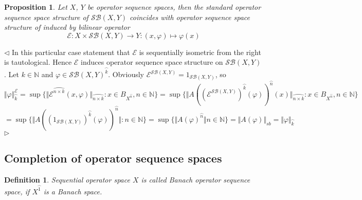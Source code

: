 \documentclass[12pt]{article}
\newtheorem{proposition}[theorem]{Proposition}
\newtheorem{definition}[theorem]{Definition}
\newenvironment{proof}{\par $\triangleleft$}{$\triangleright$}
\begin{document}
\begin{proposition}\label{PrSQOpSqQuanIsEquivToStandard}
Let $X$, $Y$ be operator sequence spaces, then the standard operator sequence 
space structure of $\mathcal{SB}(X,Y)$ coincides with operator sequence space 
structure of induced by bilinear operator
$$
\mathcal{E}:X\times\mathcal{SB}(X,Y)\to Y:(x,\varphi)\mapsto\varphi(x)
$$
\end{proposition}
\begin{proof}
In this particular case statement that $\mathcal{E}$ is sequentially isometric 
from the right is tautological. Hence $\mathcal{E}$ induces operator sequence 
space structure on $\mathcal{SB}(X,Y)$. Let $k\in\mathbb{N}$ and 
$\varphi\in{\mathcal{SB}(X,Y)}^{\wideparen{k}}$. 
Obviously $\mathcal{\mathcal{E}}^{\mathcal{SB}(X,Y)}=1_{\mathcal{SB}(X,Y)}$, so
$$
\Vert
    \varphi
\Vert_{\wideparen{k}}^{\mathcal{E}}
=\sup \{
    \Vert
        \mathcal{E}^{\wideparen{n\times k}}(x,\varphi)
    \Vert_{\wideparen{n\times k}}
    :x\in B_{X^{\wideparen{n}}},n\in\mathbb{N} \}
=\sup \{
    \Vert
        {A(
            {(
                \mathcal{E}^{\mathcal{SB}(X,Y)}
            )}^{\wideparen{k}}(\varphi)
        )}^{\wideparen{n}}(x)
    \Vert_{\wideparen{n\times k}}
    :x\in B_{X^{\wideparen{n}}}, n\in\mathbb{N}
 \}
$$
$$
=\sup \{
    \Vert
        {A({(1_{\mathcal{SB}(X,Y)})}^{\wideparen{k}}(\varphi))}^{\wideparen{n}}
    \Vert
    :n\in\mathbb{N} \}
=\sup \{
    \Vert 
        {A(\varphi)}^{\wideparen{n}}
    \Vert
        n\in\mathbb{N}
 \}
=\Vert A(\varphi)\Vert_{sb}=\Vert\varphi\Vert_{\wideparen{k}}
$$
\end{proof}

























\subsection{Completion of operator sequence spaces}

\begin{definition}\label{DefSQBanSpace}
Sequential operator space $X$ is called \textit{Banach operator sequence space}, 
if $X^{\wideparen{1}}$ is a Banach space.
\end{definition}
\end{document}
